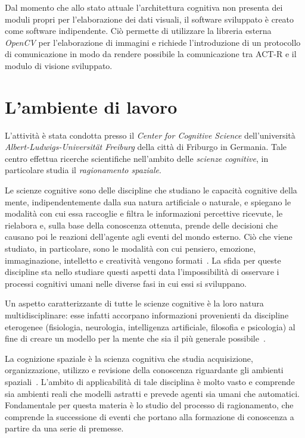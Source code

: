 	Dal momento che allo stato attuale l'architettura cognitiva non presenta dei moduli propri per l'elaborazione dei dati visuali, il software sviluppato è creato come software indipendente. 
	Ciò permette di utilizzare la libreria esterna \mbox{\emph{OpenCV}} per l'elaborazione di immagini e richiede l'introduzione di un protocollo di comunicazione in modo da rendere possibile la comunicazione tra \mbox{ACT-R} e il modulo di visione sviluppato.

	\section*{L'ambiente di lavoro}
	L'attività è stata condotta presso il \emph{Center for Cognitive Science} dell'università \emph{Albert-Ludwigs-Universität Freiburg} della città di Friburgo in Germania. 
	Tale centro effettua ricerche scientifiche nell'ambito delle \emph{scienze cognitive}, in particolare studia il \emph{ragionamento spaziale}.

	Le scienze cognitive sono delle discipline che studiano le capacità cognitive della mente, indipendentemente dalla sua natura artificiale o naturale, e spiegano le modalità con cui essa raccoglie e filtra le informazioni percettive ricevute, le rielabora e, sulla base della conoscenza ottenuta, prende delle decisioni che causano poi le reazioni dell'agente agli eventi del mondo esterno. 
	Ciò che viene studiato, in particolare, sono le modalità con cui pensiero, emozione, immaginazione, intelletto e creatività vengono formati~\cite{legrenzi2005prima}.
	La sfida per queste discipline sta nello studiare questi aspetti data l'impossibilità di osservare i processi cognitivi umani nelle diverse fasi in cui essi si sviluppano. 
	
	Un aspetto caratterizzante di tutte le scienze cognitive è la loro natura multidisciplinare: esse infatti accorpano informazioni provenienti da discipline eterogenee (fisiologia, neurologia, intelligenza artificiale, filosofia e psicologia) al fine di creare un modello per la mente che sia il più generale possibile~\cite{legrenzi2005prima}. 

	La cognizione spaziale è la scienza cognitiva che studia acquisizione, organizzazione, utilizzo e revisione della conoscenza riguardante gli ambienti spaziali~\cite{r8Cspace}. L'ambito di applicabilità di tale disciplina è molto vasto e comprende sia ambienti reali che modelli astratti e prevede agenti sia umani che automatici.
	Fondamentale per questa materia è lo studio del processo di ragionamento, che comprende la successione di eventi che portano alla formazione di conoscenza a partire da una serie di premesse. 
	
